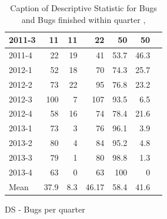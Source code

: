 \documentclass[UKenglish]{ifimaster}  %
\begin{document}
\begin{appendices}
\begin{table}[!htbp]
\begin{adjustwidth}{-2.5cm}{}
\begin{subfigure}[b]{0.4\textwidth}
{\begin{tabular}{ | l | r | r | r | r | r | r | }
2011-3 & 11 & 11 & 22 & 50 & 50 \\ \hline
2011-4 & 22 & 19 & 41 & 53.7 & 46.3 \\ \hline
2012-1 & 52 & 18 & 70 & 74.3 & 25.7 \\ \hline
2012-2 & 73 & 22 & 95 & 76.8 & 23.2 \\ \hline
2012-3 & 100 & 7 & 107 & 93.5 & 6.5 \\ \hline
2012-4 & 58 & 16 & 74 & 78.4 & 21.6 \\ \hline
2013-1 & 73 & 3 & 76 & 96.1 & 3.9 \\ \hline
2013-2 & 80 & 4 & 84 & 95.2 & 4.8 \\ \hline
2013-3 & 79 & 1 & 80 & 98.8 & 1.3 \\ \hline
2013-4 & 63 & 0 & 63 & 100 & 0 \\ \hline
Mean & 37.9 & 8.3 & 46.17 & 58.4& 41.6 \\ \hline
\end{tabular}
}
\caption{DS - Bugs per quarter}
 \label{DS:FTPQ:9}
\end{subfigure}
\end{adjustwidth}
\caption[Optional caption for list of figures]{Caption of Descriptive Statistic for Bugs and Bugs finished within quarter  , }
\label{DS:2:5} %
\end{table}


\end{appendices}
\end{document}
